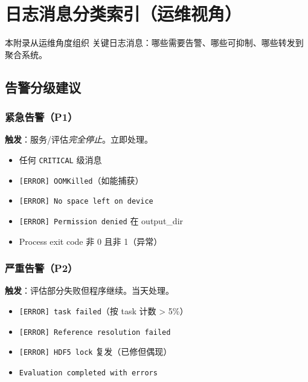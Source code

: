 
\chapter{日志消息分类索引（运维视角）}

本附录从运维角度组织 \openbench{} 关键日志消息：哪些需要告警、哪些可抑制、哪些转发到聚合系统。


\section{告警分级建议}

\subsection{紧急告警（P1）}

\textbf{触发}：服务/评估\emph{完全停止}。立即处理。

\begin{itemize}
  \item 任何 \texttt{CRITICAL} 级消息
  \item \texttt{[ERROR] OOMKilled}（如能捕获）
  \item \texttt{[ERROR] No space left on device}
  \item \texttt{[ERROR] Permission denied} 在 output\_dir
  \item Process exit code 非 0 且非 1（异常）
\end{itemize}

\subsection{严重告警（P2）}

\textbf{触发}：评估部分失败但程序继续。当天处理。

\begin{itemize}
  \item \texttt{[ERROR] task failed}（按 task 计数 > 5\%）
  \item \texttt{[ERROR] Reference resolution failed}
  \item \texttt{[ERROR] HDF5 lock} 复发（已修但偶现）
  \item \texttt{Evaluation completed with errors}
\end{itemize}

